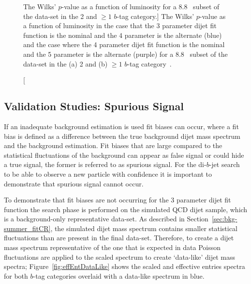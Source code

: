 \begin{figure}[!htb]
\begin{center}
  \end{center}
  \vspace{-1em}
  \caption
      [The Wilks' \mbox{$p$-value} as a function of luminosity for a 8.8~\ifb{} subset of the \summer{} data-set in the 2 and $\geq1$ $b$-tag category.]
      {The Wilks' \mbox{$p$-value} as a function of luminosity
        in the case that the 3 parameter dijet fit function is the nominal and the 4 parameter is the alternate (blue)
        and the case where the 4 parameter dijet fit function is the nominal and the 5 parameter is the alternate (purple)
        for a 8.8~\ifb{} subset of the \summer{} data-set in the (a) 2 and (b) $\geq1$ $b$-tag category~\cite{dibjet-ichep_conf}.
      }
  \label{fig:bkg-summer-wilks}
\end{figure}

\FloatBarrier

\clearpage
\subsection{Validation Studies: Spurious Signal}
\label{sec:bkg-summer_spusig}

If an inadequate background estimation is used fit biases can occur,
where a fit bias is defined as a difference between the true background
dijet mass spectrum and the background estimation.
Fit biases that are large compared to the statistical fluctuations of the background
can appear as false signal or could hide a true signal, the former is referred to as spurious signal.
For the di-$b$-jet search to be able to observe a new particle with confidence it is
important to demonstrate that spurious signal cannot occur.

To demonstrate that fit biases are not occurring for the 3 parameter dijet fit function
the search phase is performed on the simulated QCD dijet sample,
which is a background-only representative data-set. 
As described in Section~\ref{sec:bkg-summer_fitCR},
the simulated dijet mass spectrum contains smaller statistical fluctuations than are present in the final data-set.
Therefore, to create a dijet mass spectrum representative of the one that is expected in data 
Poisson fluctuations are applied to the scaled spectrum to create `data-like' dijet mass spectra;
Figure~\ref{fig:effEntDataLike} shows the scaled and effective entries spectra for both
$b$-tag categories overlaid with a data-like spectrum in blue.

